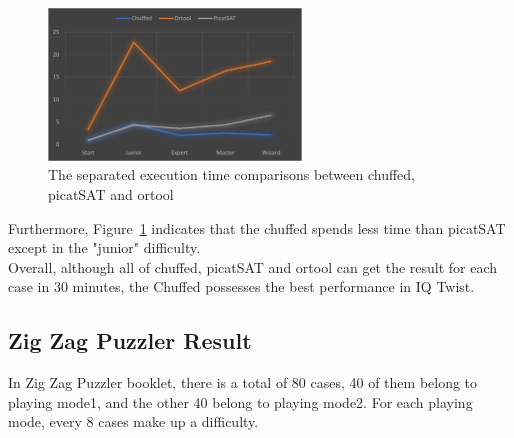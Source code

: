 \begin{figure}[htbp]
\centering
\includegraphics[width=0.6\textwidth]{figs/Three comparison.png}
\caption{The separated execution time comparisons between chuffed, picatSAT and ortool}
\label{fig:3comparison}
\end{figure}
Furthermore, Figure~\ref{fig:3comparison} indicates that the chuffed spends less time than picatSAT except in the "junior" difficulty.
\\Overall, although all of chuffed, picatSAT and ortool can get the result for each case in 30 minutes, the Chuffed possesses the best performance in IQ Twist.
\subsection{Zig Zag Puzzler Result}
\label{sec:Zig Zag Puzzlerresult}
In Zig Zag Puzzler booklet, there is a total of 80 cases, 40 of them belong to playing mode1, and the other 40 belong to playing mode2. For each playing mode, every 8 cases make up a difficulty. 
